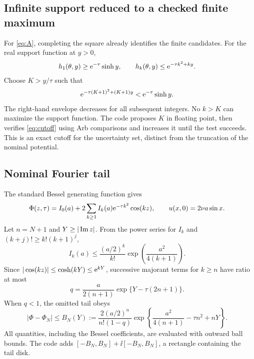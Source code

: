\documentclass[11pt]{article}
\begin{document}
\subsection{Infinite support reduced to a checked finite maximum}
For \eqref{eq:A}, completing the square already identifies the finite candidates. For the real support function at $y>0$,
\begin{equation}
 h_1(\theta,y)\ge\mathrm e^{-\tau}\sinh y,\qquad
 h_k(\theta,y)\le\mathrm e^{-\tau k^2+ky}.
\end{equation}
Choose $K>y/\tau$ such that
\begin{equation}\label{eq:cutoff}
 \mathrm e^{-\tau(K+1)^2+(K+1)y}<\mathrm e^{-\tau}\sinh y.
\end{equation}
The right-hand envelope decreases for all subsequent integers. No $k>K$ can maximize the support function. The code proposes $K$ in floating point, then verifies \eqref{eq:cutoff} using Arb comparisons and increases it until the test succeeds. This is an exact cutoff for the uncertainty set, distinct from the truncation of the nominal potential.

\subsection{Nominal Fourier tail}
The standard Bessel generating function gives \cite{dlmf}
\begin{equation}\label{eq:bessel}
 \Phi(z,\tau)=I_0(a)+2\sum_{k\ge1}I_k(a)\mathrm e^{-\tau k^2}\cos(kz),\qquad
 u(x,0)=2\nu a\sin x.
\end{equation}
Let $n=N+1$ and $Y\ge|\operatorname{Im} z|$. From the power series for $I_k$ and $(k+j)!\ge k!(k+1)^j$,
\begin{equation}
 I_k(a)\le\frac{(a/2)^k}{k!}\exp\!\left(\frac{a^2}{4(k+1)}\right).
\end{equation}
Since $|\cos(kz)|\le\cosh(kY)\le\mathrm e^{kY}$, successive majorant terms for $k\ge n$ have ratio at most
\begin{equation}
 q=\frac{a}{2(n+1)}\exp\{Y-\tau(2n+1)\}.
\end{equation}
When $q<1$, the omitted tail obeys
\begin{equation}\label{eq:tail}
 |\Phi-\Phi_N|\le B_N(Y):=
 \frac{2(a/2)^n}{n!(1-q)}
 \exp\!\left\{\frac{a^2}{4(n+1)}-\tau n^2+nY\right\}.
\end{equation}
All quantities, including the Bessel coefficients, are evaluated with outward ball bounds. The code adds $[-B_N,B_N]+\ii[-B_N,B_N]$, a rectangle containing the tail disk.
\end{document}
